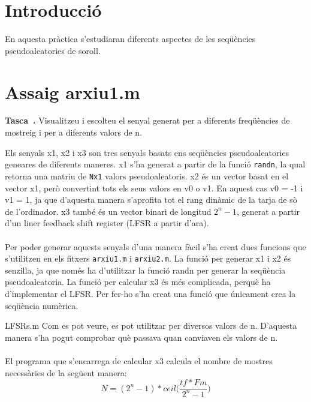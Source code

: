 \documentclass[11pt]{report}
\newcounter{previCounter}
\newenvironment{enunciat}{
  \stepcounter{previCounter}
  \par\vspace{\baselineskip}\noindent
  {\bf Tasca~\thepreviCounter.}}{\par\medskip\ignorespacesafterend}
\begin{document}
\section*{Introducció}
En aquesta pràctica s'estudiaran diferents aspectes de les seqüències pseudoaleatories de soroll.



\section*{Assaig arxiu1.m}
\begin{enunciat}
     Visualitzeu i escolteu el senyal generat per a diferents freqüències de mostreig i per a diferents valors de n.
\end{enunciat}
Els senyals x1, x2 i x3 son tres senyals basats ens seqüències pseudoaleatories geneares de diferents maneres. 
x1 s'ha generat a partir de la funció \texttt{randn}, la qual retorna una matriu de \texttt{Nx1} valors pseudoaleatoris.
x2 és un vector basat en el vector x1, però convertint tots els seus valors en v0 o v1. En aquest cas v0 = -1 i v1 = 1, ja que d'aquesta manera s'aprofita tot el rang dinàmic de la tarja de sò de l'ordinador.
x3 també és un vector binari de longitud ${2^n-1}$, generat a partir d'un liner feedback shift register (LFSR a partir d'ara).
\paragraph{}
Per poder generar aquests senyals d'una  manera fàcil s'ha creat dues funcions que s'utilitzen en els fitxers \texttt{arxiu1.m} i \texttt{arxiu2.m}.
La funció per generar x1 i x2 és senzilla, ja que només ha d'utilitzar la funció randn per generar la seqüència pseudoaleatoria.
La funció per calcular x3 és més complicada, perquè ha d'implementar el LFSR. Per fer-ho s'ha creat una funció que únicament crea la seqüència numèrica. 

 {LFSRs.m}
Com es pot veure, es pot utilitzar per diversos valors de n. D'aquesta manera s'ha pogut comprobar què passava quan canviaven els valors de n.
\paragraph{}
El programa que s'encarrega de calcular x3 calcula el nombre de mostres necessàries de la següent manera:
\begin{equation}
     N = (2^{n} - 1) * ceil\Big(\frac{tf * Fm}{2^{n} - 1}\Big)
\end{equation}
\end{document}
